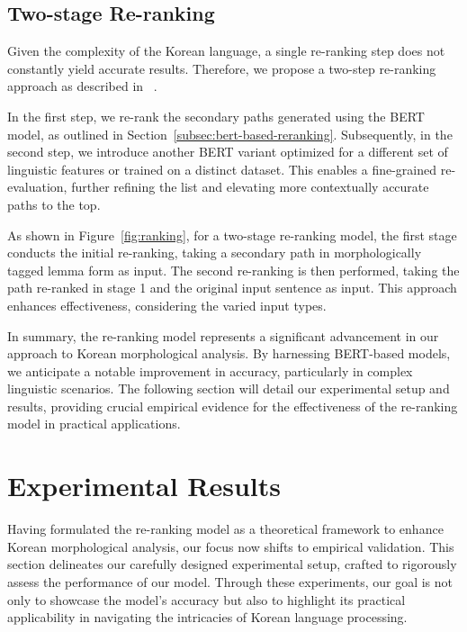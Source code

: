 \documentclass[AMS,STIX2COL]{WileyNJD-v2}
\begin{document}
    \subsection{Two-stage Re-ranking}\label{subsec:two-stage-reranking}

    Given the complexity of the Korean language, a single re-ranking step does not constantly yield accurate results.
    Therefore, we propose a two-step re-ranking approach as described in ~\cite{Nogueira2019}.

    In the first step, we re-rank the secondary paths generated using the BERT model, as outlined in Section~\ref{subsec:bert-based-reranking}.
    Subsequently, in the second step, we introduce another BERT variant optimized for a different set of linguistic features or trained on a distinct dataset.
    This enables a fine-grained re-evaluation, further refining the list and elevating more contextually accurate paths to the top.

    As shown in Figure~\ref{fig:ranking}, for a two-stage re-ranking model, the first stage conducts the initial re-ranking, taking a secondary path in morphologically tagged lemma form as input.
    The second re-ranking is then performed, taking the path re-ranked in stage 1 and the original input sentence as input.
    This approach enhances effectiveness, considering the varied input types.

    In summary, the re-ranking model represents a significant advancement in our approach to Korean morphological analysis.
    By harnessing BERT-based models, we anticipate a notable improvement in accuracy, particularly in complex linguistic scenarios.
    The following section will detail our experimental setup and results, providing crucial empirical evidence for the effectiveness of the re-ranking model in practical applications.


    \section{Experimental Results}\label{sec:results}

    Having formulated the re-ranking model as a theoretical framework to enhance Korean morphological analysis, our focus now shifts to empirical validation.
    This section delineates our carefully designed experimental setup, crafted to rigorously assess the performance of our model.
    Through these experiments, our goal is not only to showcase the model's accuracy but also to highlight its practical applicability in navigating the intricacies of Korean language processing.
\end{document}
